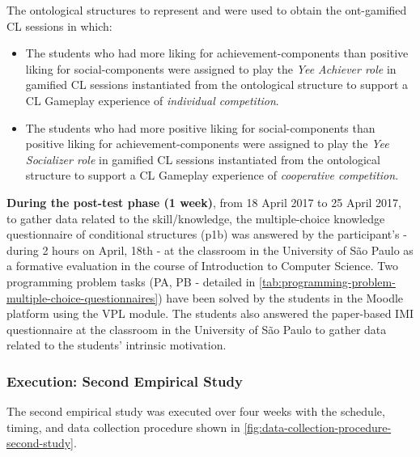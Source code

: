 The ontological structures to represent  and  were used to obtain the ont-gamified CL sessions in which:

\begin{itemize}
\item The students who had more liking for achievement-components than positive liking for social-components were assigned to play the \emph{Yee Achiever role} in gamified CL sessions instantiated from the ontological structure  to support a CL Gameplay experience of \emph{individual competition}.
\item The students who had more positive liking for social-components than positive liking for achievement-components were assigned to play the \emph{Yee Socializer role} in gamified CL sessions instantiated from the ontological structure  to support a CL Gameplay experience of \emph{cooperative competition}.
\end{itemize}

\textbf{During the post-test phase (1 week)}, from 18 April 2017 to 25 April 2017, to gather data related to the skill/knowledge, the multiple-choice knowledge questionnaire of conditional structures (p1b) was answered by the participant’s - during 2 hours on April, 18th - at the classroom in the University of São Paulo as a formative evaluation in the course of Introduction to Computer Science.
Two programming problem tasks (PA, PB - detailed in \autoref{tab:programming-problem-multiple-choice-questionnaires}) have been solved by the students in the Moodle platform using the VPL module.
The students also answered the paper-based IMI questionnaire at the classroom in the University of São Paulo to gather data related to the students' intrinsic motivation. 

\subsubsection{Execution: Second Empirical Study}

The second empirical study was executed over four weeks with the schedule, timing, and data collection procedure shown in \autoref{fig:data-collection-procedure-second-study}.


